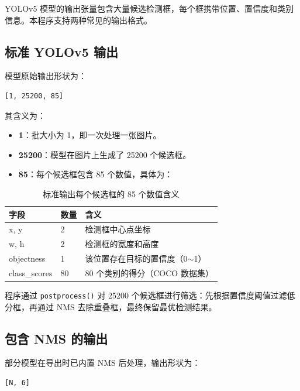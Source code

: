 YOLOv5 模型的输出张量包含大量候选检测框，每个框携带位置、置信度和类别信息。本程序支持两种常见的输出格式。

\subsection{标准 YOLOv5 输出}

模型原始输出形状为：

\begin{lstlisting}[caption={标准输出形状}]
[1, 25200, 85]
\end{lstlisting}

\noindent 其含义为：

\begin{itemize}
  \item \textbf{1}：批大小为 1，即一次处理一张图片。
  \item \textbf{25200}：模型在图片上生成了 25200 个候选框。
  \item \textbf{85}：每个候选框包含 85 个数值，具体为：
\end{itemize}

\begin{table}[htbp]
  \centering
  \caption{标准输出每个候选框的 85 个数值含义}
  \label{tab:yolo-output}
  \begin{tabular}{lll}
    \toprule
    字段 & 数量 & 含义 \\
    \midrule
    x, y & 2 & 检测框中心点坐标 \\
    w, h & 2 & 检测框的宽度和高度 \\
    objectness & 1 & 该位置存在目标的置信度（0$\sim$1） \\
    class\_scores & 80 & 80 个类别的得分（COCO 数据集） \\
    \bottomrule
  \end{tabular}
\end{table}

程序通过 \texttt{postprocess()} 对 25200 个候选框进行筛选：先根据置信度阈值过滤低分框，再通过 NMS 去除重叠框，最终保留最优检测结果。

\subsection{包含 NMS 的输出}

部分模型在导出时已内置 NMS 后处理，输出形状为：

\begin{lstlisting}[caption={NMS 后输出形状}]
[N, 6]
\end{lstlisting}

